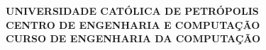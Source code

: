 \begin{center}
    \ABNTEXchapterfont\bfseries\Large{UNIVERSIDADE CATÓLICA DE PETRÓPOLIS} \\
    \ABNTEXchapterfont\bfseries\Large{CENTRO DE ENGENHARIA E COMPUTAÇÃO} \\
    \ABNTEXchapterfont\bfseries\Large{CURSO DE ENGENHARIA DA COMPUTAÇÃO} \\
\end{center}


\begin{center}
    \vspace*{\fill}\vspace*{\fill}
    \ABNTEXchapterfont\bfseries\Large\imprimirtitulo
\end{center}
    
\begin{center}
    \vspace*{\fill}
    {\ABNTEXchapterfont\large\imprimirautor}
\end{center}
    
\begin{center}
    \vspace*{\fill}\vspace*{\fill}
    \large{\imprimirlocal} \\
    \large{\imprimirdata} \\
    \vspace*{1cm}
\end{center}
\newpage
\begin{center}
    \ABNTEXchapterfont\bfseries\Large\imprimirtitulo
    \vspace*{\fill}
\end{center}

\hspace{.45\textwidth}
\begin{minipage}{.5\textwidth}
    \imprimirpreambulo
\end{minipage}%
\vspace*{\fill}

